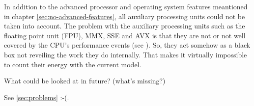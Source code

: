 \label{sec:no-aux-units}

In addition to the advanced processor and operating system features meantioned
in chapter \ref{sec:no-advanced-features}, all auxiliary processing units could
not be taken into account. The problem with the auxiliary processing units such
as the floating point unit (FPU), MMX\cite{wiki:MMX}, SSE\cite{wiki:SSE} and
AVX\cite{wiki:AVX} is that they are not or not well covered by the CPU's
performance events (see \cite{intel2011events}). So, they act somehow as a
black box not reveiling the work they do internally. That makes it virtually
impossible to count their energy with the current model.



\label{sec:outlook}

What could be looked at in future? (what's missing?)

See \ref{sec:problems} :-(.
